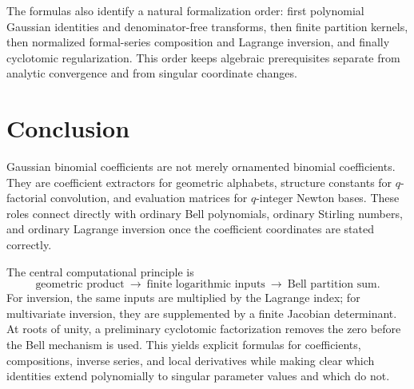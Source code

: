 \documentclass[11pt,a4paper]{article}
\numberwithin{equation}{section}
\theoremstyle{definition}
\theoremstyle{remark}
\begin{document}
The formulas also identify a natural formalization order: first polynomial
Gaussian identities and denominator-free transforms, then finite partition
kernels, then normalized formal-series composition and Lagrange inversion,
and finally cyclotomic regularization. This order keeps algebraic prerequisites
separate from analytic convergence and from singular coordinate changes.

\section{Conclusion}
Gaussian binomial coefficients are not merely ornamented binomial coefficients.
They are coefficient extractors for geometric alphabets, structure constants for
$q$-factorial convolution, and evaluation matrices for $q$-integer Newton bases.
These roles connect directly with ordinary Bell polynomials, ordinary Stirling
numbers, and ordinary Lagrange inversion once the coefficient coordinates are
stated correctly.

The central computational principle is
\[
 \text{geometric product}
 \ \longrightarrow\ \text{finite logarithmic inputs}
 \ \longrightarrow\ \text{Bell partition sum}.
\]
For inversion, the same inputs are multiplied by the Lagrange index; for
multivariate inversion, they are supplemented by a finite Jacobian determinant.
At roots of unity, a preliminary cyclotomic factorization removes the zero before
the Bell mechanism is used. This yields explicit formulas for coefficients,
compositions, inverse series, and local derivatives while making clear which
identities extend polynomially to singular parameter values and which do not.
\end{document}
